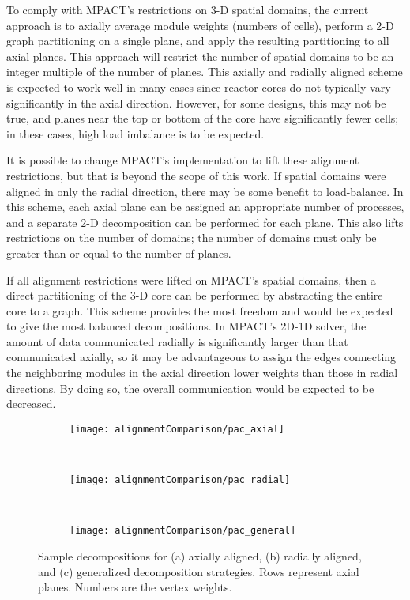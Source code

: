 {{    To comply with MPACT's restrictions on 3-D spatial domains, the current approach is to axially average module weights (numbers of cells), perform a 2-D graph partitioning on a single plane, and apply the resulting partitioning to all axial planes.
    This approach will restrict the number of spatial domains to be an integer multiple of the number of planes.
    This axially and radially aligned scheme is expected to work well in many cases since reactor cores do not typically vary significantly in the axial direction.
    However, for some designs, this may not be true, and planes near the top or bottom of the core have significantly fewer cells; in these cases, high load imbalance is to be expected.

    It is possible to change MPACT's implementation to lift these alignment restrictions, but that is beyond the scope of this work.
    If spatial domains were aligned in only the radial direction, there may be some benefit to load-balance.
    In this scheme, each axial plane can be assigned an appropriate number of processes, and a separate 2-D decomposition can be performed for each plane.
    This also lifts restrictions on the number of domains; the number of domains must only be greater than or equal to the number of planes.

    If all alignment restrictions were lifted on MPACT's spatial domains, then a direct partitioning of the 3-D core can be performed by abstracting the entire core to a graph.
    This scheme provides the most freedom and would be expected to give the most balanced decompositions.
    In MPACT's 2D-1D solver, the amount of data communicated radially is significantly larger than that communicated axially, so it may be advantageous to assign the edges connecting the neighboring modules in the axial direction lower weights than those in radial directions.
    By doing so, the overall communication would be expected to be decreased.

    \begin{figure}
      \centering
      \begin{subfigure}[t]{0.3\textwidth}
        \centering
        \texttt{[image: alignmentComparison/pac\_axial]}
        \caption{}
      \end{subfigure}%
      ~
      \begin{subfigure}[t]{0.3\textwidth}
        \centering
        \texttt{[image: alignmentComparison/pac\_radial]}
        \caption{}
      \end{subfigure}%
      ~
      \begin{subfigure}[t]{0.3\textwidth}
        \centering
        \texttt{[image: alignmentComparison/pac\_general]}
        \caption{}
      \end{subfigure}
      \caption{
        Sample decompositions for (a) axially aligned, (b) radially aligned, and (c) generalized decomposition strategies.
        Rows represent axial planes.
        Numbers are the vertex weights.
        \label{fig:Spatial Decomposition:partitionAlignmentComparison}
      }
    \end{figure}

}}
